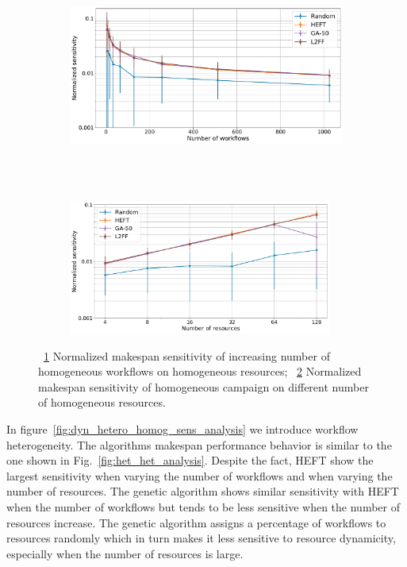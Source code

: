 \begin{figure}[ht!]
    \centering
    \begin{subfigure}[b]{0.85\textwidth}
        \includegraphics[width=.95\textwidth]{figures/campaign/StHomoCampaigns_4DynHomoResourcesSens.pdf}
        \caption{}
        \label{fig:StHomoCampaigns_4DyHomoResourcesSens}
    \end{subfigure}\\
    ~ 
    \begin{subfigure}[b]{0.85\textwidth}
        \includegraphics[width=0.95\textwidth]{figures/campaign/DynHomoResources_StHomoCampaignsSens.pdf}
        \caption{}
        \label{fig:DyHomoResources_StHomoCampaignsSens}
    \end{subfigure}
    \caption{~\ref{fig:StHomoCampaigns_4DyHomoResourcesSens} Normalized makespan sensitivity of increasing number of homogeneous workflows on homogeneous resources;
        ~\ref{fig:DyHomoResources_StHomoCampaignsSens} Normalized makespan sensitivity  of homogeneous campaign on different number of homogeneous resources.}
    \label{fig:dyn_homog_sens_analysis}
\end{figure}

In figure~\ref{fig:dyn_hetero_homog_sens_analysis} we introduce workflow heterogeneity.
The algorithms makespan performance behavior is similar to the one shown in Fig.~\ref{fig:het_het_analysis}.
Despite the fact, HEFT show the largest sensitivity when varying the number of workflows and when varying the number of resources.
The genetic algorithm shows similar sensitivity with HEFT when the number of workflows but tends to be less sensitive when the number of resources increase.
The genetic algorithm assigns a percentage of workflows to resources randomly which in turn makes it less sensitive to resource dynamicity, especially when the number of resources is large.

